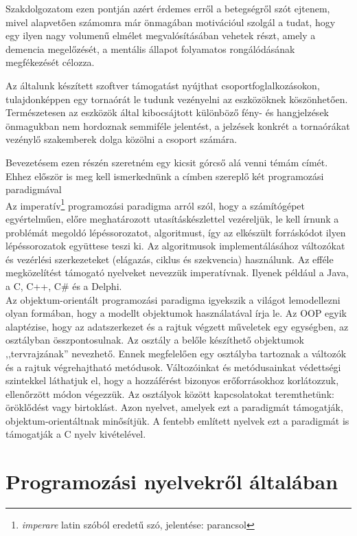 \documentclass[tocnopagenum]{thesis-ekf}
\theoremstyle{definition}
\theoremstyle{remark}
\begin{document}
	Szakdolgozatom ezen pontján azért érdemes erről a betegségről szót ejtenem, mivel alapvetően számomra már önmagában motivációul szolgál a tudat, hogy egy ilyen nagy volumenű elmélet megvalósításában vehetek részt, amely a demencia megelőzését, a mentális állapot folyamatos rongálódásának megfékezését célozza. 
	\cite{dementia1}
	\cite{dementia2}
	\cite{dementia3}
	
	Az általunk készített szoftver támogatást nyújthat csoportfoglalkozásokon, tulajdonképpen egy tornaórát le tudunk vezényelni az eszközöknek köszönhetően. Természetesen az eszközök által kibocsájtott különböző fény- és hangjelzések önmagukban nem hordoznak semmiféle jelentést, a jelzések konkrét  a tornaórákat vezénylő szakemberek dolga közölni a csoport számára.
	
	Bevezetésem ezen részén szeretném egy kicsit górcső alá venni témám címét. Ehhez először is meg kell ismerkednünk a címben szereplő két programozási paradigmával\\
	Az imperatív\footnote{\textit{imperare} latin szóból eredetű szó, jelentése: parancsol} programozási paradigma arról szól, hogy a számítógépet egyértelműen, előre meghatározott utasításkészlettel vezéreljük, le kell írnunk a problémát megoldó lépéssorozatot, algoritmust, így az elkészült forráskódot ilyen lépéssorozatok együttese teszi ki. Az algoritmusok implementálásához változókat és vezérlési szerkezeteket (elágazás, ciklus és szekvencia) használunk. Az efféle megközelítést támogató nyelveket nevezzük imperatívnak. Ilyenek például a Java, a C, C++, C\# és a Delphi.
	\\
	Az objektum-orientált programozási paradigma igyekszik a világot lemodellezni olyan formában, hogy a modellt objektumok használatával írja le. Az OOP egyik alaptézise, hogy az adatszerkezet és a rajtuk végzett műveletek egy egységben, az osztályban összpontosulnak. Az osztály a belőle készíthető objektumok ,,tervrajzának'' nevezhető. Ennek megfelelően egy osztályba tartoznak a változók és a rajtuk végrehajtható metódusok. Változóinkat és metódusainkat védettségi szintekkel láthatjuk el, hogy a hozzáférést bizonyos erőforrásokhoz korlátozzuk, ellenőrzött módon végezzük. Az osztályok között kapcsolatokat teremthetünk: öröklődést vagy birtoklást. Azon nyelvet, amelyek ezt a paradigmát támogatják, objektum-orientáltnak minősítjük.
	A fentebb említett nyelvek ezt a paradigmát is támogatják a C nyelv kivételével.
	\chapter{Programozási nyelvekről általában}
\end{document}
